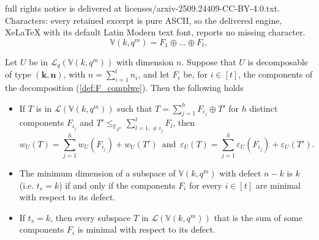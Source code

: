 \documentclass[10pt,a4paper]{amsart}
\newcommand{\fqm}{\mathbb{F}_{q^m}}
\begin{document}
full rights notice is delivered at licenses/arxiv-2509.24409-CC-BY-4.0.txt. Characters: every retained excerpt is pure ASCII, so the delivered engine, XeLaTeX with its default Latin Modern text font, reports no missing character.
  \begin{equation} \label{def:F_complwe}
      \mathbb{V}(k,q^m)=F_1\oplus \ldots \oplus F_t ,
  \end{equation}

\begin{proposition} \label{prop:decomposable}
 Let $U$ be in $\mathcal{L}_q(\mathbb{V}(k,q^m))$ with dimension $n$. Suppose that $U$ is decomposable of type $(\mathbf{k}, \mathbf{n})$, with $n=\sum_{i=1}^t n_i$, and let $F_i$ be, for $i\in[t]$, the components of the decomposition  (\ref{def:F_complwe}). Then the  following holds
 \begin{itemize}
    
     \item[1.] If $T$ is in $\mathcal{L}(\mathbb{V}(k,q^m))$ such that $T=\sum_{j=1}^{h}F_{i_j}\oplus T'$ for $h$ distinct components $F_{i_j}$ and $T'\leq_{\fqm} \sum_{l=1,\neq i_j}^{t}F_l$, then 
     \[w_U(T)=\sum_{j=1}^{h}w_U(F_{i_j})+w_U(T') \,\,\, \text{and} \,\,\, \varepsilon_U(T)=\sum_{j=1}^{h}\varepsilon_U(F_{i_j})+\varepsilon_U(T').\,\,\, \]
     \item[2.]  The minimum dimension of a subspace of $\mathbb{V}(k,q^m)$ with defect $n-k$ is $k$ (i.e. $t_s=k$) if and only if the components $F_i$ for every $i\in [t]$ are minimal with respect to its defect.
     \item[3.]  If $t_s=k$, then every subspace $T$ in $\mathcal{L}(\mathbb{V}(k,q^m))$ that is the sum of some components $F_i$  is minimal with respect to its defect.
 \end{itemize}
\end{proposition}
\end{document}
